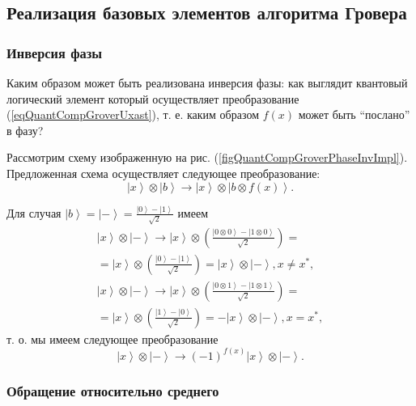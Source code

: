 \subsection{ Реализация базовых элементов алгоритма Гровера}

\subsubsection{Инверсия фазы}
Каким образом может быть реализована инверсия фазы: как выглядит
квантовый логический элемент который осуществляет преобразование
(\ref{eqQuantCompGroverUxast}), т. е. каким образом $f\left(x\right)$
может быть ``послано'' в фазу?



Рассмотрим схему изображенную на
рис. (\ref{figQuantCompGroverPhaseInvImpl}). Предложенная схема
осуществляет следующее преобразование:
\begin{equation}
\left|x\right>\otimes\left|b\right> \rightarrow 
\left|x\right>\otimes\left|b\otimes f\left(x\right)\right>.
\nonumber
\end{equation}

Для случая $\left|b\right> = \left|-\right> = 
\frac{\left|0\right> - \left|1\right>}{\sqrt{2}}$ имеем
\begin{eqnarray}
\left|x\right>\otimes\left|-\right> \rightarrow 
\left|x\right>\otimes\left(\frac{\left|0\otimes 0\right> -
  \left|1\otimes 0\right>}{\sqrt{2}}\right) = 
\nonumber \\
= \left|x\right>\otimes\left(\frac{\left|0\right> -
  \left|1\right>}{\sqrt{2}}\right) =
\left|x\right>\otimes\left|-\right>
, x \ne x^{\ast},
\nonumber \\
\left|x\right>\otimes\left|-\right> \rightarrow 
\left|x\right>\otimes\left(\frac{\left|0\otimes 1\right> -
  \left|1\otimes 1\right>}{\sqrt{2}}\right) = 
\nonumber \\
= \left|x\right>\otimes\left(\frac{\left|1\right> -
  \left|0\right>}{\sqrt{2}}\right) =
- \left|x\right>\otimes\left|-\right>
, x = x^{\ast},
\nonumber
\end{eqnarray}
т. о. мы имеем следующее преобразование
\begin{equation}
\left|x\right>\otimes\left|-\right> \rightarrow 
\left(-1\right)^{f\left(x\right)}\left|x\right>\otimes\left|-\right>.
\label{eqQuantCompGroverPhaseInvImpl}
\end{equation}

\subsubsection{Обращение относительно среднего}

